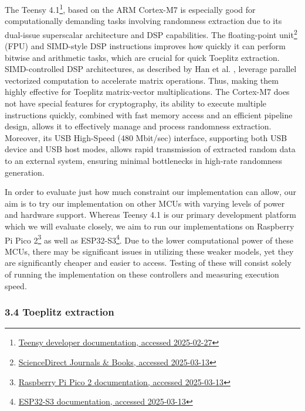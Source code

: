 \documentclass{sigchi}
\begin{document}
The Teensy 4.1\footnote{\href{https://www.pjrc.com/store/teensy41.html}{Teensy developer documentation, accessed 2025-02-27}}, based on the ARM Cortex-M7 is especially good for computationally demanding tasks involving randomness extraction due to its dual-issue superscalar architecture and DSP capabilities. The floating-point unit\footnote{\href{https://www.sciencedirect.com/topics/computer-science/floating-point-unit}{ScienceDirect Journals \& Books, accessed 2025-03-13}} (FPU) and SIMD-style DSP instructions improves how quickly it can perform bitwise and arithmetic tasks, which are crucial for quick Toeplitz extraction. SIMD-controlled DSP architectures, as described by Han et al. \cite{simd-dsp}, leverage parallel vectorized computation to accelerate matrix operations. Thus, making them highly effective for Toeplitz matrix-vector multiplications. The Cortex-M7 does not have special features for cryptography, its ability to execute multiple instructions quickly, combined with fast memory access and an efficient pipeline design, allows it to effectively manage and process randomness extraction. Moreover, its USB High-Speed (480 Mbit/sec) interface, supporting both USB device and USB host modes, allows rapid transmission of extracted random data to an external system, ensuring minimal bottlenecks in high-rate randomness generation.

In order to evaluate just how much constraint our implementation can allow, our aim is to try our implementation on other MCUs with varying levels of power and hardware support. Whereas Teensy 4.1 is our primary development platform which we will evaluate closely, we aim to run our implementations on Raspberry Pi Pico 2\footnote{\href{https://datasheets.raspberrypi.com/pico/pico-2-product-brief.pdf}{Raspberry Pi Pico 2 documentation, accessed 2025-03-13}} as well as ESP32-S3\footnote{\href{https://www.espressif.com/sites/default/files/documentation/esp32-s3_datasheet_en.pdf}{ESP32-S3 documentation, accessed 2025-03-13}}. Due to the lower computational power of these MCUs, there may be significant issues in utilizing these weaker models, yet they are significantly cheaper and easier to access. Testing of these will consist solely of running the implementation on these controllers and measuring execution speed.

\subsubsection{\texorpdfstring{3.4 Toeplitz extraction }{3.4 Toeplitz extraction }}\label{toeplitz-extraction}
\end{document}
